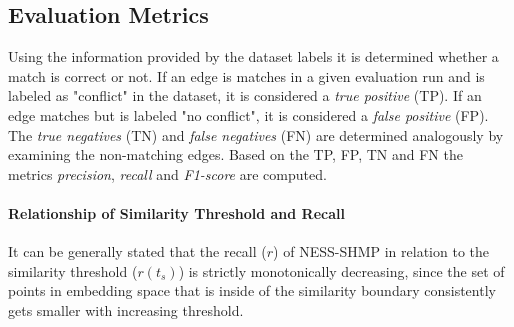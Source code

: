 \documentclass[11pt]{scrreprt}
\begin{document}
\subsection{Evaluation Metrics}
\label{sec:evaluation-metrics}
Using the information provided by the dataset labels it is determined whether a match is correct or not. If an edge is matches in a given evaluation run and is labeled as "conflict" in the dataset, it is considered a \textit{true positive} (TP). If an edge matches but is labeled "no conflict", it is considered a \textit{false positive} (FP). The \textit{true negatives} (TN) and \textit{false negatives} (FN) are determined analogously  by examining the non-matching edges. Based on the TP, FP, TN and FN the metrics \textit{precision}, \textit{recall} and \textit{F1-score} are computed. 

\paragraph{Relationship of Similarity Threshold and Recall}
It can be generally stated that the recall (\(r\)) of NESS-SHMP in relation to the similarity threshold (\(r(t_s)\)) is strictly monotonically decreasing, since the set of points in embedding space that is inside of the similarity boundary consistently gets smaller with increasing threshold. 

\end{document}
